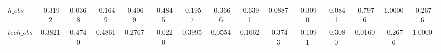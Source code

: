 \begin{center}
\begin{longtable}{lcccccccccccccc}
$h\_obs         $	 & 	          -0.3192	 & 	           0.0368	 & 	          -0.1649	 & 	          -0.4069	 & 	          -0.4845	 & 	          -0.1957	 & 	          -0.3666	 & 	          -0.6391	 & 	           0.0887	 & 	          -0.3090	 & 	          -0.0841	 & 	          -0.7976	 & 	           1.0000	 & 	          -0.2676 \\ 
$tech\_obs      $	 & 	           0.3821	 & 	           0.4740	 & 	           0.4861	 & 	           0.2767	 & 	          -0.0220	 & 	           0.3995	 & 	           0.0554	 & 	           0.1062	 & 	          -0.3743	 & 	          -0.1091	 & 	          -0.3080	 & 	           0.0160	 & 	          -0.2676	 & 	           1.0000 \\ 
\end{longtable}
 \end{center}
